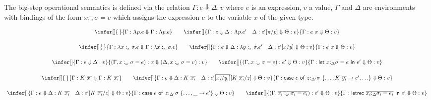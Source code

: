 \documentclass[acmsmall,review,anonymous,screen]{acmart}
\newcommand{\llet}[2]{\mathsf{let}~#1~\mathsf{in}~#2}
\newcommand{\lletrec}[2]{\mathsf{letrec}~#1~\mathsf{in}~#2}
\newcommand{\ccase}[2]{\mathsf{case}~#1~\mathsf{of}~#2}
\begin{document}
The big-step operational semantics is defined via the relation
$\Gamma : e \Downarrow \Delta : v$ where $e$ is an expression, $v$ a
value, $\Gamma$ and $\Delta$ are environments with bindings of the
form $x:_\omega\sigma = e$ which assigns the expression $e$ to the
variable $x$ of the given type.

\[
  \begin{array}{c}
    \infer[]
    {\,}
    {\Gamma : \Lambda p.e \Downarrow \Gamma : \Lambda p.e}
    \qquad
    \infer[]
    {\Gamma : e\Downarrow \Delta : \Lambda p.e' \quad \Delta :
    e'[\pi/p]\Downarrow \Theta : v}
    {\Gamma : e~\pi\Downarrow \Theta : v }\\[1.5em]
    \infer[]
    {\,}
    {\Gamma : \lambda x:_\pi \sigma . e \Downarrow \Gamma : \lambda x:_\pi \sigma . e }
    \qquad
    \infer[]
    {\Gamma : e \Downarrow \Delta : \lambda y:_\pi \sigma . e' \quad
    \Delta : e'[x/y] \Downarrow \Theta : v }
    {\Gamma : e~x \Downarrow \Theta : v}\\[1.5em]
    \infer[]
    {\Gamma : e \Downarrow \Delta : v}
    {(\Gamma , x:_\omega \sigma = e) : x \Downarrow (\Delta,x:_\omega
    \sigma = v) : v}
    \qquad
    \infer[]
    {(\Gamma,x:_\omega \sigma = e) : e' \Downarrow \Theta : v}
    {\Gamma : \llet{x{:}_{\Delta}\sigma = e}{e'}\Downarrow \Theta : v
    }\\[1.5em]
    \infer[]
    {\,}
    {\Gamma : K~\ov{x_i} \Downarrow \Gamma : K~\ov{x_i}}
    \qquad
    \infer[]
    {\Gamma : e \Downarrow \Delta : K~\ov{x_i} \quad
    \Delta : e'\ov{[x_i/y_i]}[K~\ov{x_i}/z] \Downarrow \Theta : v }
    {\Gamma :
    \ccase{e}{z{:}_{\Delta'}\sigma~\{{\dots,K~\ov{y_i} \to e', {\dots}}\}}
    \Downarrow \Theta : v}\\[1.5em]
    \infer[]
    {\Gamma : e \Downarrow \Delta : K~\ov{x_i} \quad
    \Delta : e'[K~\ov{x_i}/z] \Downarrow \Theta : v }
    {\Gamma :
    \ccase{e}{z{:}_{\Delta'}\sigma~\{\dots , \_\to
    e'}\} \Downarrow \Theta : v}
    \qquad
    \infer[]
    {%
    (\Gamma, \overline{x_i:_\omega \sigma_i = e_i}) : e' \Downarrow \Theta
    : v
    }
    {\Gamma : \lletrec{\overline{x_i{:}_{\Delta}\sigma_i = e_i}}{e'}
    \Downarrow \Theta : v}
    \end{array}
\]
\end{document}
